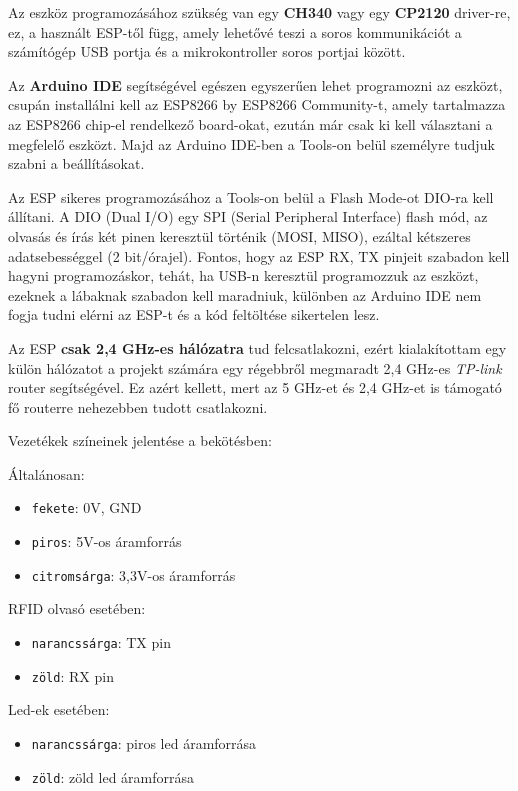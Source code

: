 \documentclass[
]{thesis-ekf}
\theoremstyle{definition}
\theoremstyle{remark}
\begin{document}
Az eszköz programozásához szükség van egy \textbf{CH340} vagy egy \textbf{CP2120} driver-re, ez, a használt ESP-től függ, amely lehetővé teszi a soros kommunikációt a számítógép USB portja és a mikrokontroller soros portjai között.\cite{ch340}

Az \textbf{Arduino IDE} segítségével egészen egyszerűen lehet programozni az eszközt, csupán installálni kell az ESP8266 by ESP8266 Community-t, amely tartalmazza az ESP8266 chip-el rendelkező board-okat, ezután már csak ki kell választani a megfelelő eszközt.\cite{esp-arduinoide} Majd az Arduino IDE-ben a Tools-on belül személyre tudjuk szabni a beállításokat.

Az ESP sikeres programozásához a Tools-on belül a Flash Mode-ot DIO-ra kell állítani. A DIO (Dual I/O) egy SPI (Serial Peripheral Interface) flash mód, az olvasás és írás két pinen keresztül történik (MOSI, MISO), ezáltal kétszeres adatsebességgel (2 bit/órajel).\cite{flash-modes} Fontos, hogy az ESP RX, TX pinjeit szabadon kell hagyni programozáskor, tehát, ha USB-n keresztül programozzuk az eszközt, ezeknek a lábaknak szabadon kell maradniuk, különben az Arduino IDE nem fogja tudni elérni az ESP-t és a kód feltöltése sikertelen lesz.

Az ESP \textbf{csak 2,4 GHz-es hálózatra} tud felcsatlakozni, ezért kialakítottam egy külön hálózatot a projekt számára egy régebbről megmaradt 2,4 GHz-es \emph{TP-link} router segítségével. Ez azért kellett, mert az 5 GHz-et és 2,4 GHz-et is támogató fő routerre nehezebben tudott csatlakozni.

Vezetékek színeinek jelentése a bekötésben:

Általánosan:
\begin{itemize}
    \item \verb|fekete|: 0V, GND
    \item \verb|piros|: 5V-os áramforrás
    \item \verb|citromsárga|: 3,3V-os áramforrás
\end{itemize}
    
RFID olvasó esetében:
\begin{itemize}
    \item \verb|narancssárga|: TX pin
    \item \verb|zöld|: RX pin
\end{itemize}

Led-ek esetében:
\begin{itemize}
    \item \verb|narancssárga|: piros led áramforrása
    \item \verb|zöld|: zöld led áramforrása
\end{itemize}
\end{document}
